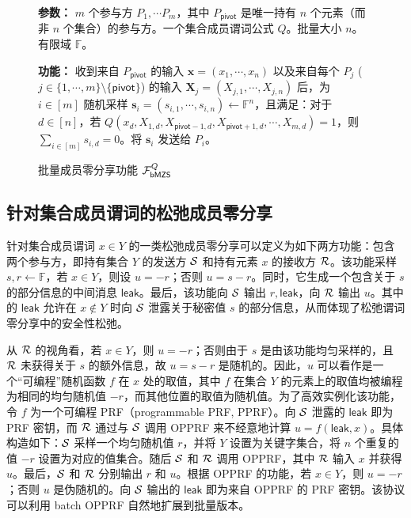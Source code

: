 \begin{figure}[!htb]
\begin{framed}
\begin{minipage}[c]{\textwidth}
\begin{trivlist}
\item \textbf{参数：} $m$ 个参与方 $P_1, \cdots P_m$，其中 $P_\mathsf{pivot}$ 是唯一持有 $n$ 个元素（而非 $n$ 个集合）的参与方。一个集合成员谓词公式 $Q$。批量大小 $n$。有限域 $\mathbb{F}$。
\item \textbf{功能：} 收到来自 $P_\mathsf{pivot}$ 的输入 $\textbf{x} = (x_1, \cdots, x_n)$ 以及来自每个 $P_j$ ($j \in \{1,\cdots,m\} \setminus \{\mathsf{pivot}\}$) 的输入 $\textbf{X}_j = (X_{j,1}, \cdots, X_{j,n})$ 后，为 $i \in [m]$ 随机采样 $\textbf{s}_i = (s_{i,1},\cdots,s_{i,n}) \gets \mathbb{F}^n$，且满足：对于 $d \in [n]$，若 $Q(x_d,X_{1,d},X_{\mathsf{pivot}-1,d},X_{\mathsf{pivot}+1,d},\cdots,X_{m,d})=1$，则 $\sum_{i \in [m]} s_{i,d} = 0$。将 $\textbf{s}_i$ 发送给 $P_i$。
\end{trivlist}
\end{minipage}
\end{framed}
\caption{批量成员零分享功能 $\mathcal{F}_\mathsf{bMZS}^Q$}\label{fig:func-bmzs}
\end{figure}

\subsection{针对集合成员谓词的松弛成员零分享}\label{zs-PMT}

针对集合成员谓词 $x \in Y$ 的一类松弛成员零分享可以定义为如下两方功能：包含两个参与方，即持有集合 $Y$ 的发送方 $\mathcal{S}$ 和持有元素 $x$ 的接收方 $\mathcal{R}$。该功能采样 $s,r \gets \mathbb{F}$，若 $x \in Y$，则设 $u = -r$；否则 $u = s - r$。同时，它生成一个包含关于 $s$ 的部分信息的中间消息 $\mathsf{leak}$。最后，该功能向 $\mathcal{S}$ 输出 $r, \mathsf{leak}$，向 $\mathcal{R}$ 输出 $u$。其中的 $\mathsf{leak}$ 允许在 $x \notin Y$ 时向 $\mathcal{S}$ 泄露关于秘密值 $s$ 的部分信息，从而体现了松弛谓词零分享中的安全性松弛。

从 $\mathcal{R}$ 的视角看，若 $x \in Y$，则 $u = -r$；否则由于 $s$ 是由该功能均匀采样的，且 $\mathcal{R}$ 未获得关于 $s$ 的额外信息，故 $u = s - r$ 是随机的。因此，$u$ 可以看作是一个“可编程”随机函数 $f$ 在 $x$ 处的取值，其中 $f$ 在集合 $Y$ 的元素上的取值均被编程为相同的均匀随机值 $-r$，而其他位置的取值为随机值。为了高效实例化该功能，令 $f$ 为一个可编程 PRF（programmable PRF, PPRF）。向 $\mathcal{S}$ 泄露的 $\mathsf{leak}$ 即为 PRF 密钥，而 $\mathcal{R}$ 通过与 $\mathcal{S}$ 调用 OPPRF 来不经意地计算 $u = f(\mathsf{leak}, x)$。具体构造如下：$\mathcal{S}$ 采样一个均匀随机值 $r$，并将 $Y$ 设置为关键字集合，将 $n$ 个重复的值 $-r$ 设置为对应的值集合。随后 $\mathcal{S}$ 和 $\mathcal{R}$ 调用 OPPRF，其中 $\mathcal{R}$ 输入 $x$ 并获得 $u$。最后，$\mathcal{S}$ 和 $\mathcal{R}$ 分别输出 $r$ 和 $u$。根据 OPPRF 的功能，若 $x \in Y$，则 $u = -r$；否则 $u$ 是伪随机的。向 $\mathcal{S}$ 输出的 $\mathsf{leak}$ 即为来自 OPPRF 的 PRF 密钥。该协议可以利用 batch OPPRF 自然地扩展到批量版本。


